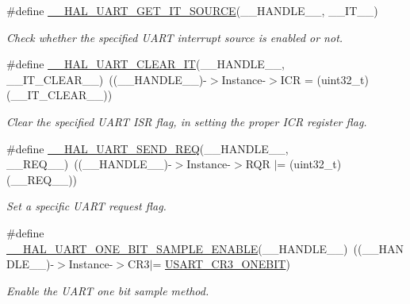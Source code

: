 \begin{DoxyCompactItemize}
\#define \hyperlink{group___u_a_r_t___exported___macros_gab7ad503802bf56bf397c392fc8e18b77}{\+\_\+\+\_\+\+H\+A\+L\+\_\+\+U\+A\+R\+T\+\_\+\+G\+E\+T\+\_\+\+I\+T\+\_\+\+S\+O\+U\+R\+CE}(\+\_\+\+\_\+\+H\+A\+N\+D\+L\+E\+\_\+\+\_\+,  \+\_\+\+\_\+\+I\+T\+\_\+\+\_\+)
\begin{DoxyCompactList}\small\item\em Check whether the specified U\+A\+RT interrupt source is enabled or not. \end{DoxyCompactList}\item 
\#define \hyperlink{group___u_a_r_t___exported___macros_gaa81e0f2503bd2a699e7e478507946bb2}{\+\_\+\+\_\+\+H\+A\+L\+\_\+\+U\+A\+R\+T\+\_\+\+C\+L\+E\+A\+R\+\_\+\+IT}(\+\_\+\+\_\+\+H\+A\+N\+D\+L\+E\+\_\+\+\_\+,  \+\_\+\+\_\+\+I\+T\+\_\+\+C\+L\+E\+A\+R\+\_\+\+\_\+)~((\+\_\+\+\_\+\+H\+A\+N\+D\+L\+E\+\_\+\+\_\+)-\/$>$Instance-\/$>$I\+CR = (uint32\+\_\+t)(\+\_\+\+\_\+\+I\+T\+\_\+\+C\+L\+E\+A\+R\+\_\+\+\_\+))
\begin{DoxyCompactList}\small\item\em Clear the specified U\+A\+RT I\+SR flag, in setting the proper I\+CR register flag. \end{DoxyCompactList}\item 
\#define \hyperlink{group___u_a_r_t___exported___macros_ga568a15495a9e2a9d230474b9e8bcc8e4}{\+\_\+\+\_\+\+H\+A\+L\+\_\+\+U\+A\+R\+T\+\_\+\+S\+E\+N\+D\+\_\+\+R\+EQ}(\+\_\+\+\_\+\+H\+A\+N\+D\+L\+E\+\_\+\+\_\+,  \+\_\+\+\_\+\+R\+E\+Q\+\_\+\+\_\+)~((\+\_\+\+\_\+\+H\+A\+N\+D\+L\+E\+\_\+\+\_\+)-\/$>$Instance-\/$>$R\+QR $\vert$= (uint32\+\_\+t)(\+\_\+\+\_\+\+R\+E\+Q\+\_\+\+\_\+))
\begin{DoxyCompactList}\small\item\em Set a specific U\+A\+RT request flag. \end{DoxyCompactList}\item 
\#define \hyperlink{group___u_a_r_t___exported___macros_ga3524747e5896296ab066d786431503ce}{\+\_\+\+\_\+\+H\+A\+L\+\_\+\+U\+A\+R\+T\+\_\+\+O\+N\+E\+\_\+\+B\+I\+T\+\_\+\+S\+A\+M\+P\+L\+E\+\_\+\+E\+N\+A\+B\+LE}(\+\_\+\+\_\+\+H\+A\+N\+D\+L\+E\+\_\+\+\_\+)~((\+\_\+\+\_\+\+H\+A\+N\+D\+L\+E\+\_\+\+\_\+)-\/$>$Instance-\/$>$C\+R3$\vert$= \hyperlink{group___peripheral___registers___bits___definition_ga9a96fb1a7beab602cbc8cb0393593826}{U\+S\+A\+R\+T\+\_\+\+C\+R3\+\_\+\+O\+N\+E\+B\+IT})
\begin{DoxyCompactList}\small\item\em Enable the U\+A\+RT one bit sample method. \end{DoxyCompactList}\item 

\end{DoxyCompactItemize}
